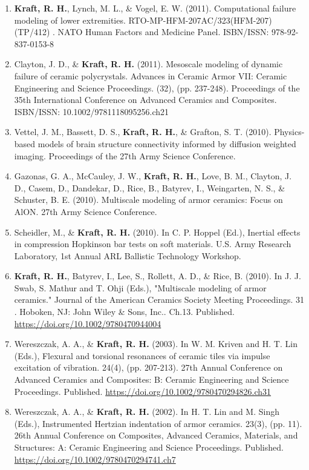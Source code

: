 \documentclass[a4paper,10pt]{article}
\begin{document}
\begin{enumerate}
\item \textbf{\textbf{Kraft,} R. H.}, Lynch, M. L., \& Vogel, E. W. (2011). Computational failure modeling of lower extremities. RTO-MP-HFM-207AC/323(HFM-207)(TP/412) . NATO Human Factors and Medicine Panel. ISBN/ISSN: 978-92-837-0153-8
\item Clayton, J. D., \& \textbf{\textbf{Kraft,} R. H.} (2011). Mesoscale modeling of dynamic failure of ceramic polycrystals. Advances in Ceramic Armor VII: Ceramic Engineering and Science Proceedings. (32), (pp. 237-248). Proceedings of the 35th International Conference on Advanced Ceramics and Composites. ISBN/ISSN: 10.1002/9781118095256.ch21
\item Vettel, J. M., Bassett, D. S., \textbf{\textbf{Kraft,} R. H.}, \& Grafton, S. T. (2010). Physics-based models of brain structure connectivity informed by diffusion weighted imaging. Proceedings of the 27th Army Science Conference.
\item Gazonas, G. A., McCauley, J. W., \textbf{\textbf{Kraft,} R. H.}, Love, B. M., Clayton, J. D., Casem, D., Dandekar, D., Rice, B., Batyrev, I., Weingarten, N. S., \& Schuster, B. E. (2010). Multiscale modeling of armor ceramics: Focus on AlON. 27th Army Science Conference.
\item Scheidler, M., \& \textbf{\textbf{Kraft,} R. H.} (2010). In C. P. Hoppel (Ed.), Inertial effects in compression Hopkinson bar tests on soft materials. U.S. Army Research Laboratory, 1st Annual ARL Ballistic Technology Workshop.
\item \textbf{\textbf{Kraft,} R. H.}, Batyrev, I., Lee, S., Rollett, A. D., \& Rice, B. (2010). In J. J. Swab, S. Mathur and T. Ohji (Eds.), "Multiscale modeling of armor ceramics." Journal of the American Ceramics Society Meeting Proceedings. 31 . Hoboken, NJ: John Wiley \& Sons, Inc..  Ch.13. Published. \url{https://doi.org/10.1002/9780470944004}
\item Wereszczak, A. A., \& \textbf{\textbf{Kraft,} R. H.} (2003). In W. M. Kriven and H. T. Lin (Eds.), Flexural and torsional resonances of ceramic tiles via impulse excitation of vibration. 24(4), (pp. 207-213). 27th Annual Conference on Advanced Ceramics and Composites: B: Ceramic Engineering and Science Proceedings. Published. \url{https://doi.org/10.1002/9780470294826.ch31}
\item Wereszczak, A. A., \& \textbf{\textbf{Kraft,} R. H.} (2002). In H. T. Lin and M. Singh (Eds.), Instrumented Hertzian indentation of armor ceramics. 23(3), (pp. 11). 26th Annual Conference on Composites, Advanced Ceramics, Materials, and Structures: A: Ceramic Engineering and Science Proceedings. Published. \url{https://doi.org/10.1002/9780470294741.ch7}
\end{enumerate}
\end{document}
